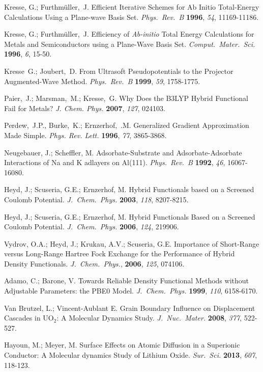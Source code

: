 \documentclass[prb,preprint,amsmath,amssymb]{revtex4}
\begin{document}
\begin{references}
Kresse, G.; Furthm\"{u}ller,~J. 
Efficient Iterative Schemes for Ab Initio Total-Energy Calculations
Using a Plane-wave Basis Set.  {\it Phys.~Rev.~B} {\bf 1996}, {\it 54},
11169-11186. 

Kresse, G.; Furthm\"{u}ller,~J. 
Efficiency of {\it Ab-initio} Total Energy Calculations for Metals and
Semiconductors using a Plane-Wave Basis Set.
{\it Comput.~Mater.~Sci.} {\bf 1996}, {\it 6}, 15-50.

Kresse~G.; Joubert,~D. 
From Ultrasoft Pseudopotentials to the Projector Augmented-Wave Method.
{\it Phys.~Rev.~B} {\bf 1999}, {\it 59}, 1758-1775.

Paier,~J.; Marsman,~M.; Kresse,~G. 
Why Does the B3LYP Hybrid Functional Fail for Metals?
{\it J. Chem. Phys.} {\bf 2007}, {\it 127}, 024103.

Perdew,~J.P., Burke,~K.;  Ernzerhof,~.M.
Generalized Gradient Approximation Made Simple.
{\it Phys. Rev. Lett.} {\bf 1996}, {\it 77}, 3865-3868.

Neugebauer, J.; Scheffler, M.  Adsorbate-Substrate and Adsorbate-Adsorbate
Interactions of Na and K adlayers on Al(111).
{\it Phys.~Rev.~B} {\bf 1992}, {\it 46}, 16067-16080.

Heyd, J.; Scuseria, G.E.; Ernzerhof, M.
Hybrid Functionals based on a Screened Coulomb Potential.
{\it J.~Chem.~Phys.} {\bf 2003}, {\it 118}, 8207-8215.

Heyd, J.; Scuseria, G.E.; Ernzerhof, M.
Hybrid Functionals Based on a Screened Coulomb Potential.
{\it J.~Chem.~Phys.} {\bf 2006}, {\it 124}, 219906.

Vydrov, O.A.; Heyd, J.; Krukau, A.V.; Scuseria, G.E.
Importance of Short-Range versus Long-Range Hartree Fock
Exchange for the Performance of Hybrid Density Functionals.
{\it J.~Chem.~Phys.}, {\bf 2006}, {\it 125}, 074106.

Adamo, C.; Barone, V.  Towards Reliable Density Functional Methods without
Adjustable Parameters: the PBE0 Model.
{\it J.~Chem.~Phys.} {\bf 1999}, {\it 110}, 6158-6170.

Van Brutzel, L.; Vincent-Aublant E.  Grain Boundary Influence on Displacement
Cascades in UO$_2$: A Molecular Dynamics Study.
{\it J.~Nuc.~Mater.} {\bf 2008}, {\it 377}, 522-527.

Hayoun, M.; Meyer, M.  Surface Effects on Atomic Diffusion in a Superionic
Conductor: A Molecular dynamics Study of Lithium Oxide.  {\it Sur.~Sci.}
{\bf 2013}, {\it 607}, 118-123.


\end{references}
\end{document}
